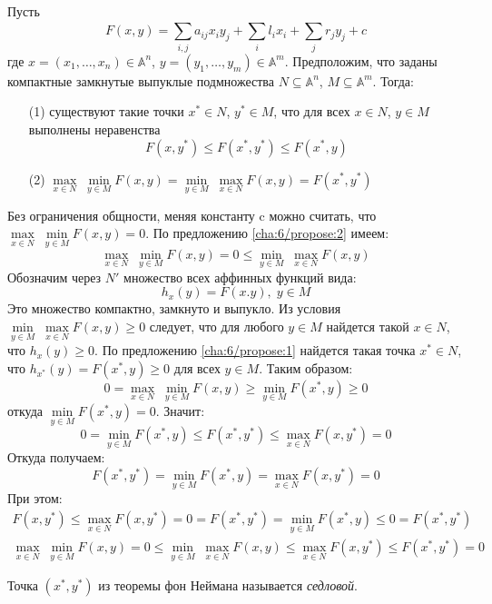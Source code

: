 \begin{theorem}\label{cha:6/the:1}
	Пусть
	$$F(x,y) = \underset{i,j}{\overset{}{\sum}} a_{ij}x_i y_j + \underset{i}{\overset{}{\sum}}l_i x_i + \underset{j}{\overset{}{\sum}}r_j y_j + c$$
	где $x = (x_1, \dots, x_n) \in \mathbb{A}^n$, $y = (y_1, \dots, y_m) \in \mathbb{A}^m$. Предположим, что заданы компактные замкнутые выпуклые подмножества $N \subseteq \mathbb{A}^n$, $M \subseteq \mathbb{A}^m$. Тогда:
	\begin{itemize}
		\item[(1)] 
			существуют такие точки $x^* \in N$, $y^* \in M$, что для всех $x \in N$, $y \in M$ выполнены неравенства
			$$F(x, y^*) \le F(x^*, y^*) \le F(x^*, y)$$
		\item[(2)] $\displaystyle \underset{x \in N}{\max} \; \underset{y \in M}{\min} F(x,y) = \underset{y \in M}{\min} \; \underset{x \in N}{\max} F(x,y) = F(x^*, y^*)$
	\end{itemize}
\end{theorem}
\begin{Proof}
	Без ограничения общности, меняя константу c можно считать, что $\underset{x \in N}{\max} \; \underset{y \in M}{\min} F(x,y) = 0$. По предложению \ref{cha:6/propose:2} имеем:
	$$\underset{x \in N}{\max} \; \underset{y \in M}{\min} F(x,y) = 0 \le \underset{y \in M}{\min} \; \underset{x \in N}{\max} F(x,y)$$
	Обозначим через $N'$ множество всех аффинных функций вида:
	$$h_x (y) = F(x.y), \; y \in M$$
	Это множество компактно, замкнуто и выпукло. Из условия $\displaystyle \underset{y \in M}{\min} \; \underset{x \in N}{\max} F(x,y) \ge 0$ следует, что для любого $y \in M$ найдется такой $x \in N$, что $h_x(y) \ge 0$. По предложению \ref{cha:6/propose:1} найдется такая точка $x^* \in N$, что $h_{x^*}(y) = F(x^*,y) \ge 0$ для всех $y \in M$. Таким образом:
	$$0 = \underset{x \in N}{\max} \; \underset{y \in M}{\min} F(x,y) \ge \underset{y \in M}{\min} F(x^*, y) \ge 0$$
	откуда $\displaystyle \underset{y \in M}{\min} F(x^*, y) = 0$. Значит:
	$$0 = \underset{y \in M}{\min} F(x^*, y) \le F(x^*, y^*) \le \underset{x \in N}{\max} F(x, y^*) = 0$$
	Откуда получаем:
	$$F(x^*, y^*) = \underset{y \in M}{\min} F(x^*, y) = \underset{x \in N}{\max} F(x, y^*) = 0$$
	При этом:
	$$\begin{gathered}
		F(x, y^*) \le \underset{x \in N}{\max} F(x, y^*) = 0 = F(x^*, y^*) = \underset{y \in M}{\min} F(x^*, y) \le 0 = F(x^*, y^*) \\
		\underset{x \in N}{\max} \; \underset{y \in M}{\min} F(x,y) = 0 \le \underset{y \in M}{\min} \; \underset{x \in N}{\max} F(x,y) \le \underset{x \in N}{\max} F(x, y^*) \le F(x^*, y^*) = 0
	\end{gathered}$$
\end{Proof}

\begin{definition}\label{cha:6/def:1}
	Точка $(x^*, y^*)$ из теоремы фон Неймана называется \textit{седловой}.
\end{definition}























